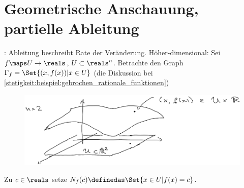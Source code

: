 \section*{Geometrische Anschauung, partielle Ableitung}
: Ableitung beschreibt Rate der Veränderung. Höher-dimensional: Sei \( f\maps U\to \reals \), \( U\subset \reals^n \). Betrachte den Graph \( \Gamma_f=\Set{(x,f(x))|x\in U} \) (\vgl die Diskussion bei \ref{stetigkeit:beispiel:gebrochen_rationale_funktionen})
\begin{figure}[H]
    \centering
    \includegraphics[width=0.8\linewidth]{figures/r2_zu_r_funktion_veranschaulichung}
    \label{fig:r2_zu_r_funktion_veranschaulichung}
\end{figure}
\begin{definition*}
    Zu \( c\in \reals \) setze \( N_f(c)\definedas \Set{x\in U|f(x)=c} \).
\end{definition*}
